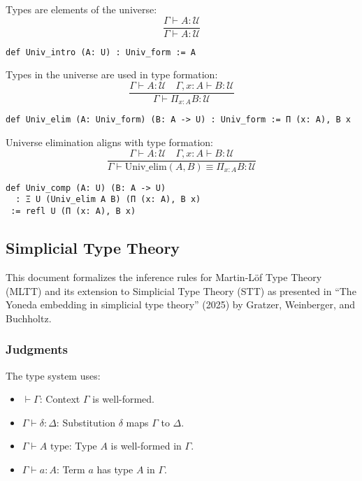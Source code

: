 \documentclass{article}
\begin{document}
\begin{definition}
Types are elements of the universe:
\[
\frac{\Gamma \vdash A : \mathcal{U}}{\Gamma \vdash A : \mathcal{U}}
\]
\begin{lstlisting}[mathescape=true]
def Univ_intro (A: U) : Univ_form := A
\end{lstlisting}
\end{definition}

\begin{definition}
Types in the universe are used in type formation:
\[
\frac{\Gamma \vdash A : \mathcal{U} \quad \Gamma, x : A \vdash B : \mathcal{U}}{\Gamma \vdash \Pi_{x : A} B : \mathcal{U}}
\]
\begin{lstlisting}[mathescape=true]
def Univ_elim (A: Univ_form) (B: A -> U) : Univ_form := Π (x: A), B x
\end{lstlisting}
\end{definition}

\begin{theorem}
Universe elimination aligns with type formation:
\[
 \frac{\Gamma \vdash A : \mathcal{U} \quad \Gamma, x : A \vdash B : \mathcal{U}}{\Gamma \vdash \mathrm{Univ\_elim}(A, B) \equiv \Pi_{x : A} B : \mathcal{U}}
\]
\begin{lstlisting}[mathescape=true]
def Univ_comp (A: U) (B: A -> U)
  : Ξ U (Univ_elim A B) (Π (x: A), B x)
 := refl U (Π (x: A), B x)
\end{lstlisting}
\end{theorem}

\newpage
\subsection{Simplicial Type Theory}

This document formalizes the inference rules for Martin-L\"of Type Theory (MLTT)
and its extension to Simplicial Type Theory (STT) as presented in ``The Yoneda
embedding in simplicial type theory'' (2025) by Gratzer, Weinberger, and Buchholtz.

\subsubsection{Judgments}
The type system uses:
\begin{itemize}
    \item $\vdash \Gamma$: Context $\Gamma$ is well-formed.
    \item $\Gamma \vdash \delta : \Delta$: Substitution $\delta$ maps $\Gamma$ to $\Delta$.
    \item $\Gamma \vdash A \text{ type}$: Type $A$ is well-formed in $\Gamma$.
    \item $\Gamma \vdash a : A$: Term $a$ has type $A$ in $\Gamma$.
\end{itemize}
\end{document}

